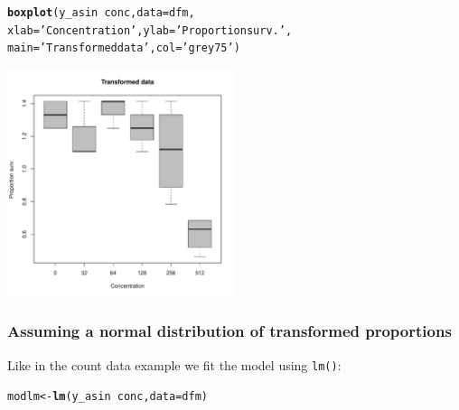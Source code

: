\documentclass{scrartcl}\usepackage[]{graphicx}\usepackage[]{color}
\makeatletter
\newcommand{\hlstr}[1]{\textcolor[rgb]{0.192,0.494,0.8}{#1}}%
\newcommand{\hlopt}[1]{\textcolor[rgb]{0,0,0}{#1}}%
\newcommand{\hlstd}[1]{\textcolor[rgb]{0.345,0.345,0.345}{#1}}%
\newcommand{\hlkwb}[1]{\textcolor[rgb]{0.69,0.353,0.396}{#1}}%
\newcommand{\hlkwc}[1]{\textcolor[rgb]{0.333,0.667,0.333}{#1}}%
\newcommand{\hlkwd}[1]{\textcolor[rgb]{0.737,0.353,0.396}{\textbf{#1}}}%
\newenvironment{kframe}{%
 \def\at@end@of@kframe{}%
 \ifinner\ifhmode%
  \def\at@end@of@kframe{\end{minipage}}%
  \begin{minipage}{\columnwidth}%
 \fi\fi%
 \def\FrameCommand##1{\hskip\@totalleftmargin \hskip-\fboxsep
 \colorbox{shadecolor}{##1}\hskip-\fboxsep
     \hskip-\linewidth \hskip-\@totalleftmargin \hskip\columnwidth}%
 \MakeFramed {\advance\hsize-\width
   \@totalleftmargin\z@ \linewidth\hsize
   \@setminipage}}%
 {\par\unskip\endMakeFramed%
 \at@end@of@kframe}
\newenvironment{knitrout}{}{} %
\makeatother
\begin{document}
\begin{knitrout}
\color{fgcolor}\begin{kframe}
\begin{alltt}
\hlkwd{boxplot}\hlstd{(y_asin} \hlopt{~} \hlstd{conc,} \hlkwc{data} \hlstd{= dfm,}
        \hlkwc{xlab} \hlstd{=} \hlstr{'Concentration'}\hlstd{,} \hlkwc{ylab} \hlstd{=} \hlstr{'Proportion surv.'}\hlstd{,}
        \hlkwc{main} \hlstd{=} \hlstr{'Transformed data'}\hlstd{,} \hlkwc{col} \hlstd{=} \hlstr{'grey75'}\hlstd{)}
\end{alltt}
\end{kframe}
\includegraphics[width=0.5\textwidth]{figure/bin_trans_plot-1} 

\end{knitrout}

\subsubsection{Assuming a normal distribution of transformed proportions}
Like in the count data example we fit the model using \texttt{lm()}:
\begin{knitrout}
\color{fgcolor}\begin{kframe}
\begin{alltt}
\hlstd{modlm} \hlkwb{<-} \hlkwd{lm}\hlstd{(y_asin} \hlopt{~} \hlstd{conc,} \hlkwc{data} \hlstd{= dfm)}
\end{alltt}
\end{kframe}
\end{knitrout}
\end{document}
